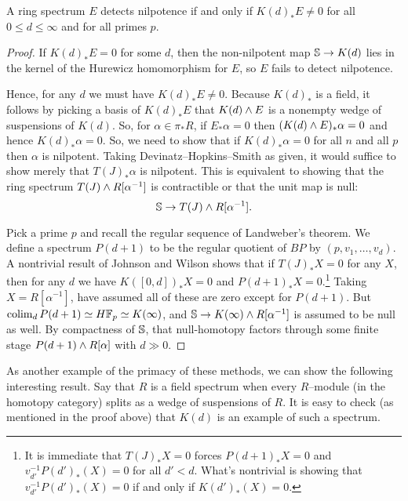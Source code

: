 \begin{theorem}
A ring spectrum $E$ detects nilpotence if and only if $K(d)_* E \ne 0$ for all $0 \le d \le \infty$ and for all primes $p$.
\end{theorem}
\begin{proof}
If $K(d)_* E = 0$ for some $d$, then the non-nilpotent map $\S \to K(d)$ lies in the kernel of the Hurewicz homomorphism for $E$, so $E$ fails to detect nilpotence.

Hence, for any $d$ we must have $K(d)_* E \ne 0$.  Because $K(d)_*$ is a field, it follows by picking a basis of $K(d)_* E$ that $K(d) \sm E$ is a nonempty wedge of suspensions of $K(d)$.  So, for $\alpha \in \pi_* R$, if $E_* \alpha = 0$ then $(K(d) \sm E)_* \alpha = 0$ and hence $K(d)_* \alpha = 0$.  So, we need to show that if $K(d)_* \alpha = 0$ for all $n$ and all $p$ then $\alpha$ is nilpotent.  Taking Devinatz--Hopkins--Smith as given, it would suffice to show merely that $T(J)_* \alpha$ is nilpotent.  This is equivalent to showing that the ring spectrum $T(J) \sm R[\alpha^{-1}]$ is contractible or that the unit map is null: \[\S \to T(J) \sm R[\alpha^{-1}].\]

Pick a prime $p$ and recall the regular sequence of Landweber's theorem.  We define a spectrum $P(d+1)$ to be the regular quotient of $BP$ by $(p, v_1, \ldots, v_d)$.  A nontrivial result of Johnson and Wilson shows that if $T(J)_* X = 0$ for any $X$, then for any $d$ we have $K([0, d])_* X = 0$ and $P(d+1)_* X = 0$.\footnote{It is immediate that $T(J)_* X = 0$ forces $P(d+1)_* X = 0$ and $v_{d'}^{-1} P(d')_*(X) = 0$ for all $d' < d$.  What's nontrivial is showing that $v_{d'}^{-1} P(d')_*(X) = 0$ if and only if $K(d')_*(X) = 0$.}  Taking $X = R[\alpha^{-1}]$, have assumed all of these are zero except for $P(d+1)$.  But $\colim_d P(d+1) \simeq H\F_p \simeq K(\infty)$, and $\S \to K(\infty) \sm R[\alpha^{-1}]$ is assumed to be null as well.  By compactness of $\S$, that null-homotopy factors through some finite stage $P(d+1) \sm R[\alpha]$ with $d \gg 0$.
\end{proof}

As another example of the primacy of these methods, we can show the following interesting result.  Say that $R$ is a field spectrum when every $R$--module (in the homotopy category) splits as a wedge of suspensions of $R$.  It is easy to check (as mentioned in the proof above) that $K(d)$ is an example of such a spectrum.


